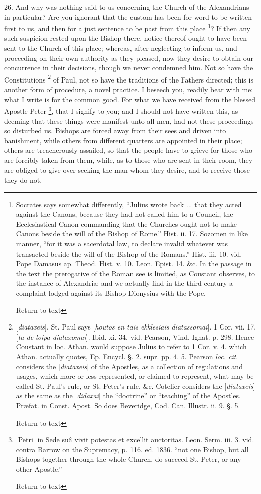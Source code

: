 26. And why was nothing said to us concerning the
Church of the Alexandrians in particular? Are you ignorant that the
custom has been for word to be written first to us, and then for a
just sentence to be past from this place \footnote{Socrates says somewhat differently, ``Julius wrote back ... that they
acted against the Canons, because they had not called him to a
Council, the Ecclesiastical Canon commanding that the Churches ought
not to make Canons beside the will of the Bishop of Rome.'' Hist. ii.
17. Sozomen in like manner, ``for it was a sacerdotal law, to declare
invalid whatever was transacted beside the will of the Bishop of the
Romans.'' Hist. iii. 10. vid. Pope Damasus ap. Theod. Hist. v. 10.
Leon. Epist. 14. \&c. In the passage in the text the prerogative of
the Roman see is limited, as Coustant observes, to the instance of
Alexandria; and we actually find in the third century a complaint
lodged against its Bishop Dionysius with the Pope.

Return to text}? If then any such suspicion rested upon the Bishop there,
notice thereof ought to have been sent to the Church of this place;
whereas, after neglecting to inform us, and proceeding on their own
authority as they pleased, now they desire to obtain our
concurrence in their decisions, though we never condemned him. Not so
have the Constitutions \footnote{[\emph{diataxeis}]. St. Paul says [\emph{hout\={o}s en tais ekkl\={e}siais
diatassomai}]. 1 Cor. vii. 17. [\emph{ta de loipa diataxomai}].
Ibid. xi. 34. vid. Pearson, Vind. Ignat. p. 298. Hence Coustant in
loc. Athan. would suppose Julius to refer to 1 Cor. v. 4. which Athan.
actually quotes, Ep. Encycl. §. 2. supr. pp. 4. 5. Pearson \emph{loc.
cit}. considers the [\emph{diataxeis}] of the Apostles, as a
collection of regulations and usages, which more or less represented,
or claimed to represent, what may be called St. Paul's rule, or St.
Peter's rule, \&c. Cotelier considers the [\emph{diataxeis}] as the
same as the [\emph{didaxai}] the ``doctrine'' or ``teaching'' of the
Apostles. Præfat. in Const. Apost. So does Beveridge, Cod. Can.
Illustr. ii. 9. §. 5.

Return to text} of
Paul, not so have the traditions of the Fathers directed; this is
another form of procedure, a novel practice. I beseech you, readily
bear with me: what I write is for the common good. For what we have
received from the blessed Apostle Peter \footnote{[Petri] in Sede suâ vivit potestas et excellit auctoritas. Leon. Serm.
iii. 3. vid. contra Barrow on the Supremacy, p. 116. ed. 1836. ``not
one Bishop, but all Bishops together through the whole Church, do
succeed St. Peter, or any other Apostle.''

Return to text

}, that I signify to you; and I should not have written this, as
deeming that these things were manifest unto all men, had not these
proceedings so disturbed us. Bishops are forced away from their sees
and driven into banishment, while others from different quarters are
appointed in their place; others are treacherously assailed, so that
the people have to grieve for those who are forcibly taken from them,
while, as to those who are sent in their room, they are obliged to
give over seeking the man whom they desire, and to receive those they
do not.

